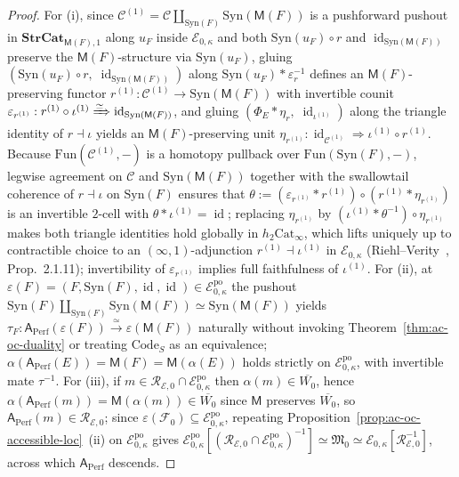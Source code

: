\documentclass[11pt]{article}
\theoremstyle{plain}
\theoremstyle{definition}
\newcommand{\cF}{\mathcal{F}}
\newcommand{\cC}{\mathcal{C}}
\newcommand{\fM}{\mathfrak{M}}
\newcommand{\Fun}{\mathrm{Fun}}
\newcommand{\Cat}{\mathrm{Cat}}
\newcommand{\Syn}{\mathrm{Syn}}
\newcommand{\cE}{\mathcal{E}}
\DeclareMathOperator{\id}{id}
\begin{document}
\begin{proof}
For (i), since $\cC^{(1)} = \cC \amalg_{\Syn(F)} \Syn(\mathsf{M}(F))$ is a pushforward pushout in $\mathbf{StrCat}_{\mathsf{M}(F), 1}$ along $u_F$ inside $\cE_{0,\kappa}$ and both $\Syn(u_F) \circ r$ and $\id_{\Syn(\mathsf{M}(F))}$ preserve the $\mathsf{M}(F)$-structure via $\Syn(u_F)$, gluing $(\Syn(u_F) \circ r,\; \id_{\Syn(\mathsf{M}(F))})$ along $\Syn(u_F) \ast \varepsilon_r^{-1}$ defines an $\mathsf{M}(F)$-preserving functor $r^{(1)} : \cC^{(1)} \to \Syn(\mathsf{M}(F))$ with invertible counit $\varepsilon_{r^{(1)}} : r^{(1)} \circ \iota^{(1)} \xRightarrow{\simeq} \id_{\Syn(\mathsf{M}(F))}$, and gluing $(\Phi_E \ast \eta_r,\; \id_{\iota^{(1)}})$ along the triangle identity of $r \dashv \iota$ yields an $\mathsf{M}(F)$-preserving unit $\eta_{r^{(1)}} : \id_{\cC^{(1)}} \Rightarrow \iota^{(1)} \circ r^{(1)}$. Because $\Fun(\cC^{(1)}, -)$ is a homotopy pullback over $\Fun(\Syn(F), -)$, legwise agreement on $\cC$ and $\Syn(\mathsf{M}(F))$ together with the swallowtail coherence of $r \dashv \iota$ on $\Syn(F)$ ensures that $\theta := (\varepsilon_{r^{(1)}} \ast r^{(1)}) \circ (r^{(1)} \ast \eta_{r^{(1)}})$ is an invertible $2$-cell with $\theta \ast \iota^{(1)} = \id$; replacing $\eta_{r^{(1)}}$ by $(\iota^{(1)} \ast \theta^{-1}) \circ \eta_{r^{(1)}}$ makes both triangle identities hold globally in $h_2\Cat_\infty$, which lifts uniquely up to contractible choice to an $(\infty, 1)$-adjunction $r^{(1)} \dashv \iota^{(1)}$ in $\cE_{0,\kappa}$ (Riehl--Verity~\cite{RiehlVerity2022}, Prop.~2.1.11); invertibility of $\varepsilon_{r^{(1)}}$ implies full faithfulness of $\iota^{(1)}$. For (ii), at $\varepsilon(F) = (F, \Syn(F), \id, \id) \in \cE_{0,\kappa}^{\mathrm{po}}$ the pushout $\Syn(F) \amalg_{\Syn(F)} \Syn(\mathsf{M}(F)) \simeq \Syn(\mathsf{M}(F))$ yields $\tau_F : \mathsf{A}_{\mathrm{Perf}}(\varepsilon(F)) \xrightarrow{\simeq} \varepsilon(\mathsf{M}(F))$ naturally without invoking Theorem~\ref{thm:ac-oc-duality} or treating $\mathrm{Code}_S$ as an equivalence; $\alpha(\mathsf{A}_{\mathrm{Perf}}(E)) = \mathsf{M}(F) = \mathsf{M}(\alpha(E))$ holds strictly on $\cE_{0,\kappa}^{\mathrm{po}}$, with invertible mate $\tau^{-1}$. For (iii), if $m \in \mathcal{R}_{\cE, 0} \cap \cE_{0,\kappa}^{\mathrm{po}}$ then $\alpha(m) \in \overline{W_0}$, hence $\alpha(\mathsf{A}_{\mathrm{Perf}}(m)) = \mathsf{M}(\alpha(m)) \in \overline{W_0}$ since $\mathsf{M}$ preserves $\overline{W_0}$, so $\mathsf{A}_{\mathrm{Perf}}(m) \in \mathcal{R}_{\cE, 0}$; since $\varepsilon(\cF_0) \subseteq \cE_{0,\kappa}^{\mathrm{po}}$, repeating Proposition~\ref{prop:ac-oc-accessible-loc}~(ii) on $\cE_{0,\kappa}^{\mathrm{po}}$ gives $\cE_{0,\kappa}^{\mathrm{po}}[(\mathcal{R}_{\cE,0} \cap \cE_{0,\kappa}^{\mathrm{po}})^{-1}] \simeq \fM_0 \simeq \cE_{0,\kappa}[\mathcal{R}_{\cE,0}^{-1}]$, across which $\mathsf{A}_{\mathrm{Perf}}$ descends.
\end{proof}
\end{document}
